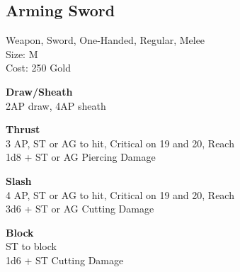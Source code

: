 \subsection{Arming Sword}\label{weapon:armingSword}
Weapon, Sword, One-Handed, Regular, Melee\\
Size: M\\
Cost: 250 Gold

\textbf{Draw/Sheath}\\
2AP draw, 4AP sheath

\textbf{Thrust}\\
3 AP, ST or AG to hit, Critical on 19 and 20,  Reach\\
1d8 + \texttimes ST or AG Piercing Damage

\textbf{Slash}\\
4 AP, ST or AG to hit, Critical on 19 and 20,  Reach\\
3d6 + \texttimes ST or AG Cutting Damage

\textbf{Block}\\
ST to block\\
1d6 + \texttimes ST Cutting Damage